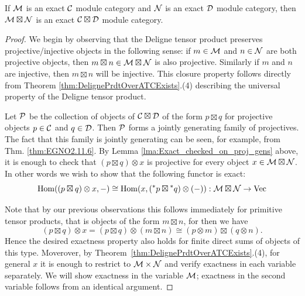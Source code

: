 \documentclass{amsart}
\begin{document}
\begin{theorem}\label{thm:tensor-exactness}
If $\mathcal M$ is an exact $\mathcal C$ module category and $\mathcal N$ is an exact $\mathcal D$ module category, then $\mathcal M \boxtimes \mathcal N$ is an exact $\mathcal C \boxtimes \mathcal D$ module category.
\end{theorem}
\begin{proof}
We begin by observing that the Deligne tensor product preserves projective/injective objects in the following sense: if $m \in \mathcal M$ and $n \in \mathcal N$ are both projective objects, then $m \boxtimes n \in \mathcal M \boxtimes \mathcal N$ is also projective. Similarly if $m$ and $n$ are injective, then $m \boxtimes n$ will be injective. This closure property follows directly from Theorem \ref{thm:DelignePrdtOverATCExists}.(4) describing the universal property of the Deligne tensor product. 	
	
Let $\mathcal P$ be the collection of objects of $\mathcal C \boxtimes \mathcal D$ of the form $p \boxtimes q$ for projective objects $p \in \mathcal C$ and $q \in \mathcal D$. Then $\mathcal P$ forms a jointly generating family of projectives. The fact that this family is jointly generating can be seen, for example, from Thm. \ref{thm:EGNO2.11.6}. By Lemma \ref{lma:Exact_checked_on_proj_gens} above, it is enough to check that $(p \boxtimes q) \otimes x$ is projective for every object $x \in \mathcal M \boxtimes \mathcal N$. In other words we wish to show that the following functor is exact:
\begin{equation*}
	\operatorname{Hom}((p \boxtimes q) \otimes x, -) \cong \operatorname{Hom}(x, ({}^*p \boxtimes {}^*q) \otimes(-) ): \mathcal M \boxtimes \mathcal N \to \mathrm{Vec}
\end{equation*}

Note that by our previous observations this follows immediately for primitive tensor products, that is 
 objects of the form $ m \boxtimes n$, for then we have
\begin{equation*}
	(p \boxtimes q) \otimes x = (p \boxtimes q) \otimes (m \boxtimes n) \cong (p \otimes m) \boxtimes (q \otimes n).
\end{equation*}
Hence the desired exactness property also holds for finite direct sums of objects of this type. Moverover, by Theorem~\ref{thm:DelignePrdtOverATCExists}.(4), for general $x$ it is enough to restrict to $\mathcal M \times \mathcal N$ and 
verify exactness in each variable separately. We will show exactness in the variable $\mathcal M$; exactness in the second variable follows from an identical argument. 


\end{proof}
\end{document}
